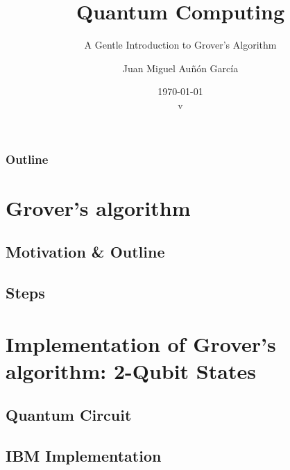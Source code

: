 \documentclass[aspectratio=169]{beamer}
\title[Quantum Computing: Shor's]{Quantum Computing}
\subtitle{A Gentle Introduction to Grover's Algorithm}
\date{\today\\ v}
\author[jmaunon]{Juan Miguel Au\~n\'on Garc\'ia}
\begin{document}
\begin{frame}
\titlepage
\end{frame}


\begin{frame}[plain]
\frametitle{Outline}
\tableofcontents

\end{frame}


%


\section{Grover's algorithm}


\subsection{Motivation \& Outline}



\subsection{Steps}





\section{Implementation of Grover's algorithm: 2-Qubit States}
\subsection{Quantum Circuit}

\subsection{IBM Implementation}
%
\end{document}
